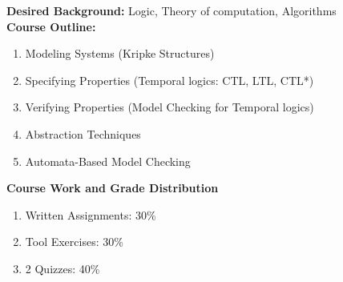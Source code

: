 \documentclass{article}
\begin{document}
{\begin{itemize}
\end{itemize}
\noindent
\textbf{Desired Background:} Logic, Theory of computation, Algorithms \\[0.25cm]
\noindent
\textbf{Course Outline:}
\begin{enumerate}
\item Modeling Systems (Kripke Structures)
\item Specifying Properties (Temporal logics: CTL, LTL, CTL*)
\item Verifying Properties (Model Checking for Temporal logics)
\item Abstraction Techniques
\item Automata-Based Model Checking
\end{enumerate}
\noindent
\textbf{Course Work and Grade Distribution}
\begin{enumerate}
\item  Written Assignments: 30\%

\item  Tool Exercises: 30\%

\item  2 Quizzes: 40\%

\end{enumerate}
}

%
%
\end{document}
